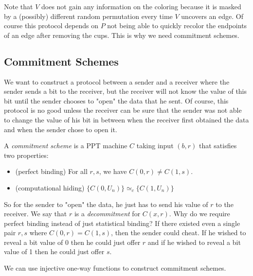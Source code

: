 Note that $V$ does not gain any information on the coloring because it is masked by a (possibly) different random permutation every time $V$ uncovers an edge. Of course this protocol depends on $P$ not being able to quickly recolor the endpoints of an edge after removing the cups. This is why we need commitment schemes.

\subsection{Commitment Schemes}

We want to construct a protocol between a sender and a receiver where the sender sends a bit to the receiver, but the receiver will not know the value of this bit until the sender chooses to "open" the data that he sent. Of course, this protocol is no good unless the receiver can be sure that the sender was not able to change the value of his bit in between when the receiver first obtained the data and when the sender chose to open it.

\begin{definition}
A \emph{commitment scheme} is a PPT machine $C$ taking input $(b,r)$ that satisfies two properties: \begin{itemize}
\item (perfect binding) For all $r, s$, we have $C(0,r) \neq C(1,s)$.

\item (computational hiding) $\{ C(0, U_n) \} \simeq_c \{ C(1, U_n) \}$

\end{itemize}
\end{definition}

So for the sender to "open" the data, he just has to send his value of $r$ to the receiver. We say that $r$ is a \emph{decommitment} for $C(x,r)$. Why do we require perfect binding instead of just statistical binding? If there existed even a single pair $r, s$ where $C(0,r) = C(1,s)$, then the sender could cheat. If he wished to reveal a bit value of 0 then he could just offer $r$ and if he wished to reveal a bit value of 1 then he could just offer $s$.

We can use injective one-way functions to construct commitment schemes.

